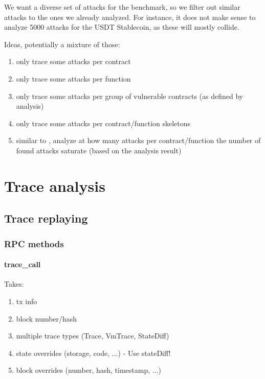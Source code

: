 \documentclass[draft,final]{vutinfth} %
\begin{document}
We want a diverse set of attacks for the benchmark, so we filter out similar attacks to the ones we already analyzed. For instance, it does not make sense to analyze 5000 attacks for the USDT Stablecoin, as these will mostly collide.

Ideas, potentially a mixture of those:

\begin{enumerate}
    \item only trace some attacks per contract
    \item only trace some attacks per function
    \item only trace some attacks per group of vulnerable contracts (as defined by analysis)
    \item only trace some attacks per contract/function skeletons
    \item similar to \cite{}, analyze at how many attacks per contract/function the number of found attacks saturate (based on the analysis result)
\end{enumerate}

\chapter{Trace analysis}

\section{Trace replaying}

\subsection{RPC methods}



\subsubsection{trace\_call}


Takes:
\begin{enumerate}
    \item tx info
    \item block number/hash
    \item multiple trace types (Trace, VmTrace, StateDiff)
    \item state overrides (storage, code, ...) - Use stateDiff!
    \item block overrides (number, hash, timestamp, ...)
\end{enumerate}
\end{document}
